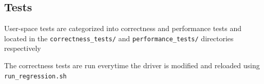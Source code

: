 \subsection*{Tests}
User-space tests are categorized into correctness and performance tests and located in the \texttt{correctness\_tests/} and \texttt{performance\_tests/} directories respectively

The correctness tests are run everytime the driver is modified and reloaded using  \texttt{run\_regression.sh}